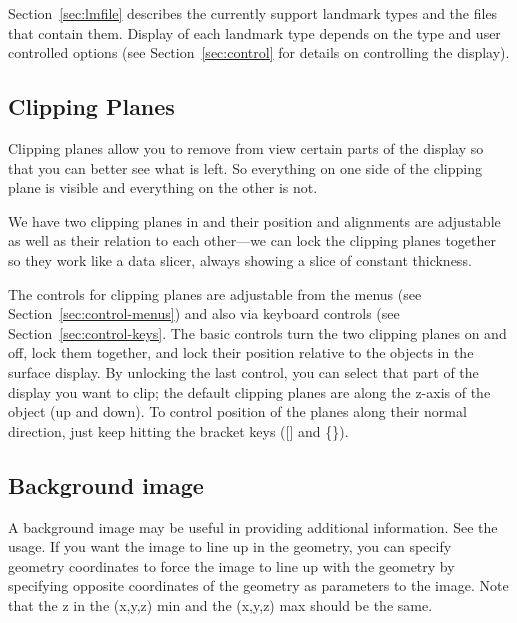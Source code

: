 Section~\ref{sec:lmfile} describes the currently support landmark types
and the files that contain them.  Display of each landmark type depends on
the type and user controlled options (see Section~\ref{sec:control} for
details on controlling the display).


\subsection{Clipping Planes}
\label{sec:clipping} 

Clipping planes allow you to remove from view certain parts of the display
so that you can better see what is left.  So everything on one side of the
clipping plane is visible and everything on the other is not.  

We have two clipping planes in \map{} and their position and alignments are
adjustable as well as their relation to each other---we can lock the
clipping planes together so they work like a data slicer, always showing a
slice of constant thickness.

The controls for clipping planes are adjustable from the menus (see
Section~\ref{sec:control-menus}) and also via keyboard controls (see
Section~\ref{sec:control-keys}.   The basic controls turn the two clipping
planes on and off, lock them together, and lock their position relative to
the objects in the surface display.  By unlocking the last control, you can
select that part of the display you want to clip; the default clipping
planes are along the z-axis of the object (up and down).  To control
position of the planes along their normal direction, just keep hitting the
bracket keys ([] and \{\}).

\subsection{Background image}
\label{sec:bgimage}

A background image may be useful in providing additional information.  See the usage.
If you want the image to line up in the geometry, you can specify geometry coordinates
to force the image to line up with the geometry by specifying opposite coordinates of the
geometry as parameters to the image.  Note that the z in the (x,y,z) min and the (x,y,z) max
should be the same.

